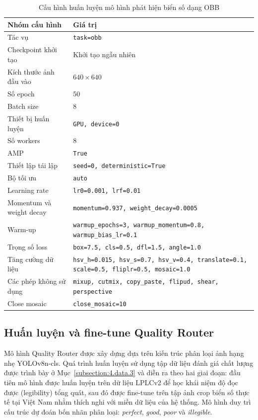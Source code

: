\documentclass[../DoAn.tex]{subfiles}
\begin{document}
\begin{table}[htbp]
\centering
\caption{Cấu hình huấn luyện mô hình phát hiện biển số dạng OBB}
\label{tab:obb_train_config}
\begin{tabularx}{\textwidth}{|l|X|}
\hline
\textbf{Nhóm cấu hình} & \textbf{Giá trị} \\
\hline
Tác vụ & \texttt{task=obb} \\
Checkpoint khởi tạo & Khởi tạo ngẫu nhiên \\
Kích thước ảnh đầu vào & $640 \times 640$ \\
Số epoch & 50 \\
Batch size & 8 \\
Thiết bị huấn luyện & \texttt{GPU, device=0} \\
Số workers & 8 \\
AMP & \texttt{True} \\
Thiết lập tái lập & \texttt{seed=0, deterministic=True} \\
Bộ tối ưu & \texttt{auto} \\
Learning rate & \texttt{lr0=0.001, lrf=0.01} \\
Momentum và weight decay & \texttt{momentum=0.937, weight\_decay=0.0005} \\
Warm-up & \texttt{warmup\_epochs=3, warmup\_momentum=0.8, warmup\_bias\_lr=0.1} \\
Trọng số loss & \texttt{box=7.5, cls=0.5, dfl=1.5, angle=1.0} \\
Tăng cường dữ liệu & \texttt{hsv\_h=0.015, hsv\_s=0.7, hsv\_v=0.4, translate=0.1, scale=0.5, fliplr=0.5, mosaic=1.0} \\
Các phép không sử dụng & \texttt{mixup, cutmix, copy\_paste, flipud, shear, perspective} \\
Close mosaic & \texttt{close\_mosaic=10} \\
\hline
\end{tabularx}
\end{table}
\subsection{Huấn luyện và fine-tune Quality Router}
\label{subsection:4.2.3_qr}

Mô hình Quality Router được xây dựng dựa trên kiến trúc phân loại ảnh hạng nhẹ YOLOv8n-cls. Quá trình huấn luyện sử dụng tập dữ liệu đánh giá chất lượng được trình bày ở Mục~\ref{subsection:4.data.3} và diễn ra theo hai giai đoạn: đầu tiên mô hình được huấn luyện trên dữ liệu LPLCv2 để học khái niệm độ đọc được (legibility) tổng quát, sau đó được fine-tune trên tập ảnh crop biển số thực tế tại Việt Nam nhằm thích nghi với miền dữ liệu của hệ thống. Mô hình duy trì cấu trúc dự đoán bốn nhãn phân loại: \textit{perfect}, \textit{good}, \textit{poor} và \textit{illegible}. 
\end{document}

